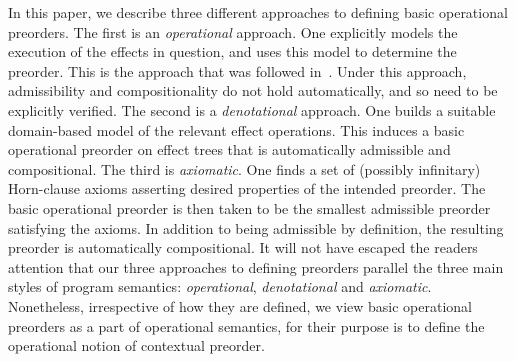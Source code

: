 In this paper, we describe three different approaches to defining basic operational preorders. 
The first is an \emph{operational} approach. One explicitly models the execution of the effects in question, and uses this model to determine the preorder. This is the approach that was followed 
in~\cite{gom}. Under this approach, admissibility and compositionality do not hold automatically, and so need to be explicitly verified. The second is a  \emph{denotational} approach. One builds a suitable domain-based model of the relevant effect operations. This induces a basic operational preorder on  effect trees that is automatically admissible and compositional. 
The third is \emph{axiomatic}. One finds a set of (possibly infinitary) Horn-clause axioms asserting desired properties of the intended preorder. The basic operational preorder is then taken to be the smallest admissible preorder satisfying the axioms. In addition to being admissible by definition, the resulting preorder is automatically compositional. 
It will not have escaped the readers attention that our three approaches to defining preorders  parallel the three main styles of program semantics: \emph{operational}, \emph{denotational} and \emph{axiomatic}. Nonetheless, irrespective of how they are defined, we view basic operational preorders as a part of operational semantics, for their purpose is to define the operational notion of contextual preorder. 

